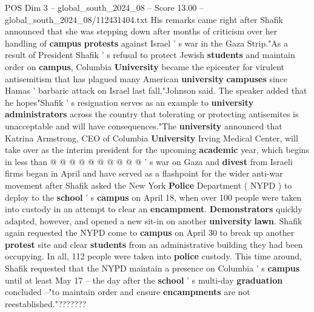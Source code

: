 \begin{textsample}{POS Dim 3 – global\_south\_2024\_08 – Score 13.00 – global\_south\_2024\_08/112431404.txt}
His remarks came right after Shafik announced that she was stepping down after months of criticism over her handling of \textbf{campus} \textbf{protests} against Israel ' s war in the Gaza Strip."As a result of President Shafik ' s refusal to protect Jewish \textbf{students} and maintain order on \textbf{campus}, Columbia \textbf{University} became the epicenter for virulent antisemitism that has plagued many American \textbf{university} \textbf{campuses} since Hamas ' barbaric attack on Israel last fall,"Johnson said.
The speaker added that he hopes"Shafik ' s resignation serves as an example to \textbf{university} \textbf{administrators} across the country that tolerating or protecting antisemites is unacceptable and will have consequences."The \textbf{university} announced that Katrina Armstrong, CEO of Columbia \textbf{University} Irving Medical Center, will take over as the interim president for the upcoming \textbf{academic} year, which begins in less than @ @ @ @ @ @ @ @ @ @ ' s war on Gaza and \textbf{divest} from Israeli firms began in April and have served as a flashpoint for the wider anti-war movement after Shafik asked the New York \textbf{Police} Department ( NYPD ) to deploy to the \textbf{school} ' s \textbf{campus} on April 18, when over 100 people were taken into custody in an attempt to clear an \textbf{encampment}. \textbf{Demonstrators} quickly adapted, however, and opened a new sit-in on another \textbf{university} \textbf{lawn}.
Shafik again requested the NYPD come to \textbf{campus} on April 30 to break up another \textbf{protest} site and clear \textbf{students} from an administrative building they had been occupying.
In all, 112 people were taken into \textbf{police} custody.
This time around, Shafik requested that the NYPD maintain a presence on Columbia ' s \textbf{campus} until at least May 17 -- the day after the \textbf{school} ' s multi-day \textbf{graduation} concluded --"to maintain order and ensure \textbf{encampments} are not reestablished."???????

\end{textsample}
